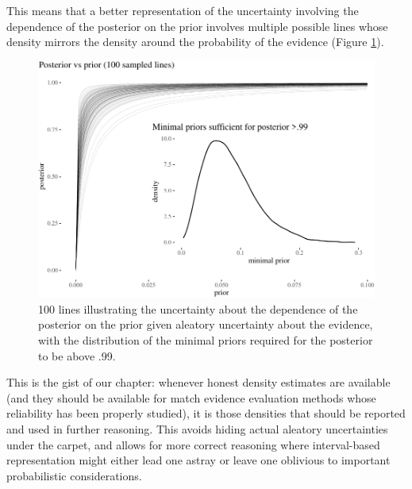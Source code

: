 \documentclass[
  10pt,
  dvipsnames,enabledeprecatedfontcommands]{scrartcl}
\begin{document}
This means that a better representation of the uncertainty involving the
dependence of the posterior on the prior involves multiple possible
lines whose density mirrors the density around the probability of the
evidence (Figure \ref{fig:lines}).

\begin{figure}[H]

\begin{center}\includegraphics[width=0.8\linewidth]{chapter-outline_files/figure-latex/fig:lines3-1} \end{center}

\caption{100 lines illustrating the uncertainty about the dependence of the posterior on the prior given aleatory uncertainty about the evidence, with the distribution of the minimal priors required for the posterior to be above .99.}

\label{fig:lines}

\end{figure}


This is the gist of our chapter: whenever honest density estimates are
available (and they should be available for match evidence evaluation
methods whose reliability has been properly studied), it is those
densities that should be reported and used in further reasoning. This
avoids hiding actual aleatory uncertainties under the carpet, and allows
for more correct reasoning where interval-based representation might
either lead one astray or leave one oblivious to important probabilistic
considerations.
\end{document}
